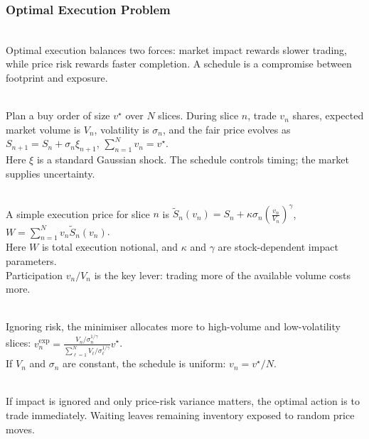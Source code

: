 \subsubsection{Optimal Execution Problem}

\begin{principle} \\
Optimal execution balances two forces: market impact rewards slower trading, while price risk rewards faster completion. A schedule is a compromise between footprint and exposure.
\end{principle}

\begin{model} \\
Plan a buy order of size $v^\star$ over $N$ slices. During slice $n$, trade $v_n$ shares, expected market volume is $V_n$, volatility is $\sigma_n$, and the fair price evolves as $S_{n+1}=S_n+\sigma_n\xi_{n+1}$, $\sum\limits_{n=1}^{N}v_n=v^\star$.\\
Here $\xi$ is a standard Gaussian shock. The schedule controls timing; the market supplies uncertainty.
\end{model}

\begin{model} \\
A simple execution price for slice $n$ is $\widetilde{S}_n(v_n)=S_n+\kappa\sigma_n\left(\frac{v_n}{V_n}\right)^\gamma$, $W=\sum\limits_{n=1}^{N}v_n\widetilde{S}_n(v_n)$.\\
Here $W$ is total execution notional, and $\kappa$ and $\gamma$ are stock-dependent impact parameters.\\
Participation $v_n/V_n$ is the key lever: trading more of the available volume costs more.
\end{model}

\begin{definition} \\
Ignoring risk, the minimiser allocates more to high-volume and low-volatility slices: $v_n^{\mathrm{exp}} =\frac{V_n/\sigma_n^{1/\gamma}}{\sum\limits_{\ell=1}^{N}V_\ell/\sigma_\ell^{1/\gamma}}v^\star$.\\
If $V_n$ and $\sigma_n$ are constant, the schedule is uniform: $v_n=v^\star/N$.
\end{definition}

\begin{mechanism} \\
If impact is ignored and only price-risk variance matters, the optimal action is to trade immediately. Waiting leaves remaining inventory exposed to random price moves.
\end{mechanism}

